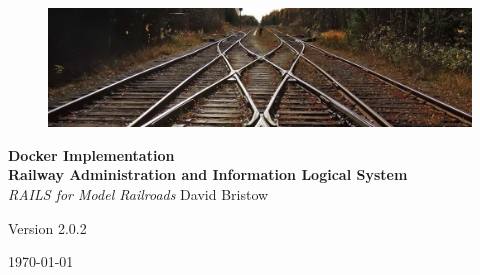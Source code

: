 \documentclass[letterpaper, oneside, 11pt]{book}
\begin{document}
\begin{titlepage}
	\raggedleft
	\begin{figure}[H]
	\centering
		\includegraphics[scale=1.53]{../System/railway_track.jpg}
	\label{fig:track}
\end{figure}
	\vspace*{0.167\textheight}
	\textbf{\LARGE Docker Implementation}\\[\baselineskip]
    \textbf{\textcolor{MyBlue}{\Huge R\Large ailway \Huge A\Large dministration and \Huge I\Large nformation \Huge L\Large ogical \Huge S\Large ystem}}\\[\baselineskip]
	{\Large \textit{RAILS for Model Railroads}}
	\vfill
    \vspace*{\baselineskip}
	{\small David Bristow}

	{\small Version 2.0.2}
	
	{\small \today}
	\vspace*{3\baselineskip}
\end{titlepage}
\tableofcontents





\backmatter

\printnoidxglossary[sort=letter]
\end{document}
